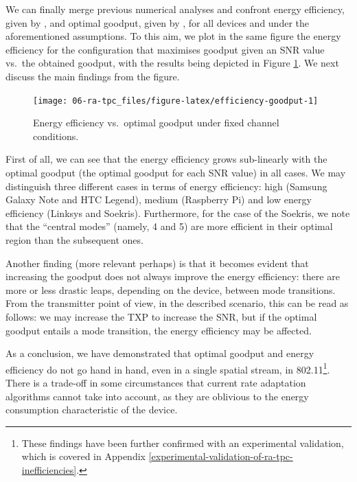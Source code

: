 \documentclass[twoside,nohyper]{tufte-book}
\makeatletter
\let\orig@maketag@@@\maketag@@@
\renewcommand{\eqref}[1]{\textup{\let\maketag@@@\orig@maketag@@@\tagform@{\ref{#1}}}}
\def\maketag@@@#1{\hbox{\rlap{\kern\marginparsep\m@th\normalfont#1}\kern1sp}}
\makeatother
\begin{document}
We can finally merge previous numerical analyses and confront energy efficiency, given by \eqref{eq:efficiency}, and optimal goodput, given by \eqref{eq:maxgoodput}, for all devices and under the aforementioned assumptions. To this aim, we plot in the same figure the energy efficiency for the configuration that maximises goodput given an SNR value vs.~the obtained goodput, with the results being depicted in Figure \ref{fig:efficiency-goodput}. We next discuss the main findings from the figure.



\begin{figure}

{\centering \texttt{[image: 06-ra-tpc\_files/figure-latex/efficiency-goodput-1]} 

}

\caption[Energy efficiency vs.~optimal goodput under fixed channel conditions.]{Energy efficiency vs.~optimal goodput under fixed channel conditions.}\label{fig:efficiency-goodput}
\end{figure}

First of all, we can see that the energy efficiency grows sub-linearly with the optimal goodput (the optimal goodput for each SNR value) in all cases. We may distinguish three different cases in terms of energy efficiency: high (Samsung Galaxy Note and HTC Legend), medium (Raspberry Pi) and low energy efficiency (Linksys and Soekris). Furthermore, for the case of the Soekris, we note that the ``central modes'' (namely, 4 and 5) are more efficient in their optimal region than the subsequent ones.

Another finding (more relevant perhaps) is that it becomes evident that increasing the goodput does not always improve the energy efficiency: there are more or less drastic leaps, depending on the device, between mode transitions. From the transmitter point of view, in the described scenario, this can be read as follows: we may increase the TXP to increase the SNR, but if the optimal goodput entails a mode transition, the energy efficiency may be affected.

As a conclusion, we have demonstrated that optimal goodput and energy efficiency do not go hand in hand, even in a single spatial stream, in 802.11\footnote{These findings have been further confirmed with an experimental validation, which is covered in Appendix \ref{experimental-validation-of-ra-tpc-inefficiencies}.}. There is a trade-off in some circumstances that current rate adaptation algorithms cannot take into account, as they are oblivious to the energy consumption characteristic of the device.
\end{document}

